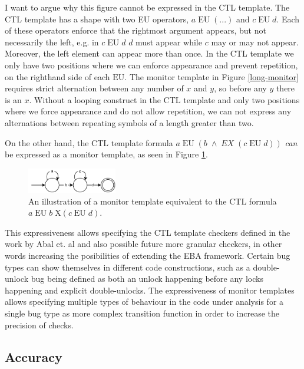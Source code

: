 \newpar I want to argue why this figure cannot be expressed in the CTL template. The CTL template has a shape with two EU operators, $a\;\text{EU}\;(...)$ and $c\;\text{EU}\;d$. Each of these operators enforce that the rightmost argument appears, but not necessarily the left, e.g. in $c\;\text{EU}\;d$ $d$ must appear while $c$ may or may not appear. Moreover, the left element can appear more than once. In the CTL template we only have two positions where we can enforce appearance and prevent repetition, on the righthand side of each $\text{EU}$. The monitor template in Figure \ref{long-monitor} requires strict alternation between any number of $x$ and $y$, so before any $y$ there is an $x$. Without a looping construct in the CTL template and only two positions where we force appearance and do not allow repetition, we can not express any alternations between repeating symbols of a length greater than two. 

\newpar On the other hand, the CTL template formula $a\;\text{EU}\;(b\;\land\;EX\;(c\;\text{EU}\;d))$ \textit{can} be expressed as a monitor template, as seen in Figure \ref{ctl-as-monitor}. 

\begin{figure}[H]
    \centering
    \includegraphics[width=0.35\textwidth]{evaluation/figures/ctl-as-monitor}
    \caption{An illustration of a monitor template equivalent to the CTL formula $a\;\text{EU}\;b\;\text{X}(c\;\text{EU}\;d)$.}
    \label{ctl-as-monitor}
\end{figure}

\newpar This expressiveness allows specifying the CTL template checkers defined in the work by Abal et. al and also possible future more granular checkers, in other words increasing the posibilities of extending the EBA framework. Certain bug types can show themselves in different code constructions, such as a double-unlock bug being defined as both an unlock happening before any locks happening and explicit double-unlocks. The expressiveness of monitor templates allows specifying multiple types of behaviour in the code under analysis for a single bug type as more complex transition function in order to increase the precision of checks.

\subsection{Accuracy}

